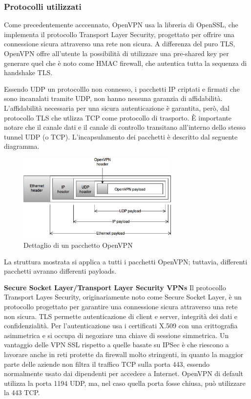 \subsubsection{Protocolli utilizzati}
Come precedentemente acccennato, OpenVPN usa la libreria di OpenSSL, che implementa il protocollo Transport Layer Security, progettato per offrire una connessione sicura attraverso una rete non sicura.
A differenza del puro TLS, OpenVPN offre all'utente la possibilità di utilizzare una pre-shared key per generare quel che è noto come HMAC firewall, che autentica tutta la sequenza di handshake TLS.

Essendo UDP un protocolllo non connesso, i pacchetti IP criptati e firmati che sono incanalati tramite UDP, non hanno nessuna garanzia di affidabilità. L'affidabilità necessaria per una sicura autenticazione è garantita, però, dal protocollo TLS che utlizza TCP come protocollo di trasporto.
È importante notare che il canale dati e il canale di controllo transitano all'interno dello stesso tunnel UDP (o TCP). L'incapsulamento dei pacchetti è descritto dal seguente diagramma.

\begin{figure}
    \centering
    \includegraphics[width=8cm]{figure/OVPN_packet.png}
    \caption{Dettaglio di un pacchetto OpenVPN}
\end{figure}

La struttura mostrata si applica a tutti i pacchetti OpenVPN; tuttavia, differenti pacchetti avranno differenti payloads.


\noindent \textbf{Secure Socket Layer/Transport Layer Security VPNs}
Il protocollo Transport Layes Security, originariamente noto come Secure Socket Layer, è un protocollo progettato per garantire una connessione sicura attraverso una rete non sicura. TLS permette autenticazione di client e server, integrità dei dati e confidenzialità. Per l'autenticazione usa i certificati X.509 \cite[RFC5280]{RFC5280} con una crittografia asimmetrica e si occupa di negoziare una chiave di sessione simmetrica.
Un vantaggio delle VPN SSL rispetto a quelle basate su IPSec è che riescono a lavorare anche in reti protette da firewall molto stringenti, in quanto la maggior parte delle aziende non filtra il traffico TCP sulla porta 443, essendo normalmente usato dai dipendenti per accedere a Internet. OpenVPN di default utilizza la porta 1194 UDP, ma, nel caso quella porta fosse chiusa, può utilizzare la 443 TCP.


